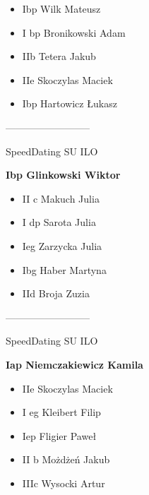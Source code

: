 \documentclass[a4paper,10pt]{article}
\begin{document}
\begin{multicols}{3}
\begin{minipage}[l]{\textwidth}
  \begin{itemize}
    \item Ibp Wilk Mateusz
    \item I bp Bronikowski Adam
    \item IIb Tetera Jakub
    \item IIe Skoczylas Maciek
    \item Ibp Hartowicz Łukasz

    \end{itemize}



\end{minipage}



\begin{minipage}[l]{\textwidth}
--------------------------

  \footnotesize{SpeedDating SU ILO}

  \bfseries{Ibp Glinkowski Wiktor}

  \begin{itemize}
    \item II c Makuch Julia
    \item I dp Sarota Julia
    \item Ieg Zarzycka Julia
    \item Ibg Haber Martyna
    \item IId Broja Zuzia

    \end{itemize}



\end{minipage}



\begin{minipage}[l]{\textwidth}
--------------------------

  \footnotesize{SpeedDating SU ILO}

  \bfseries{Iap Niemczakiewicz Kamila}

  \begin{itemize}
    \item IIe Skoczylas Maciek
    \item I eg Kleibert Filip
    \item Iep Fligier Paweł
    \item II b Możdżeń Jakub
    \item IIIc Wysocki Artur

    \end{itemize}




\end{minipage}
\end{multicols}
\end{document}
